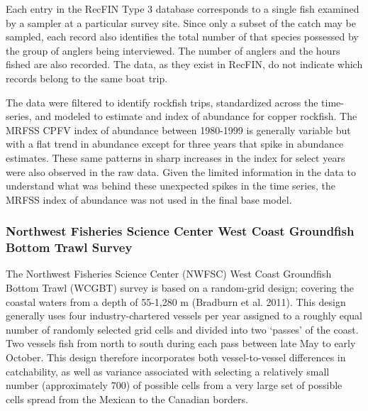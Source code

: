 \documentclass[11pt,
  english,
  letterpaper,
]{article}
\begin{document}
Each entry in the RecFIN Type 3 database corresponds to a single fish examined by a sampler at a particular survey site. Since only a subset of the catch may be sampled, each record also identifies the total number of that species possessed by the group of anglers being interviewed. The number of anglers and the hours fished are also recorded. The data, as they exist in RecFIN, do not indicate which records belong to the same boat trip.

The data were filtered to identify rockfish trips, standardized across the time-series, and modeled to estimate and index of abundance for copper rockfish. The MRFSS CPFV index of abundance between 1980-1999 is generally variable but with a flat trend in abundance except for three years that spike in abundance estimates. These same patterns in sharp increases in the index for select years were also observed in the raw data. Given the limited information in the data to understand what was behind these unexpected spikes in the time series, the MRFSS index of abundance was not used in the final base model.

\hypertarget{northwest-fisheries-science-center-west-coast-groundfish-bottom-trawl-survey}{%
\subsubsection{Northwest Fisheries Science Center West Coast Groundfish Bottom Trawl Survey}\label{northwest-fisheries-science-center-west-coast-groundfish-bottom-trawl-survey}}

The Northwest Fisheries Science Center (NWFSC) West Coast Groundfish Bottom Trawl (WCGBT) survey is based on a random-grid design; covering the coastal waters from a depth of 55-1,280 m (Bradburn et al. 2011). This design generally uses four industry-chartered vessels per year assigned to a roughly equal number of randomly selected grid cells and divided into two `passes' of the coast. Two vessels fish from north to south during each pass between late May to early October. This design therefore incorporates both vessel-to-vessel differences in catchability, as well as variance associated with selecting a relatively small number (approximately 700) of possible cells from a very large set of possible cells spread from the Mexican to the Canadian borders.
\end{document}
